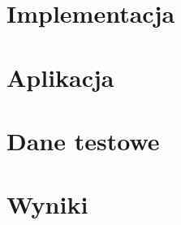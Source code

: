 \documentclass[11pt,a4paper]{report}
\begin{document}
\tableofcontents
%

\hyphenchar{}
\sloppy













%
\chapter{Implementacja}








\chapter{Aplikacja}


\chapter{Dane testowe}


\chapter{Wyniki}









\end{document}
